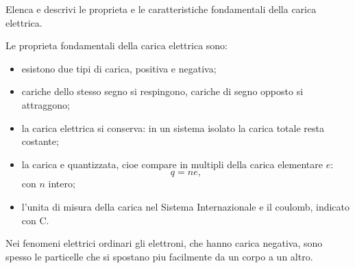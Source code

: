 
\begin{esercizio}
Elenca e descrivi le proprieta e le caratteristiche fondamentali della carica
elettrica.
\end{esercizio}

\begin{soluzione}
Le proprieta fondamentali della carica elettrica sono:
\begin{itemize}
  \item esistono due tipi di carica, positiva e negativa;
  \item cariche dello stesso segno si respingono, cariche di segno opposto si
  attraggono;
  \item la carica elettrica si conserva: in un sistema isolato la carica totale
  resta costante;
  \item la carica e quantizzata, cioe compare in multipli della carica
  elementare \(e\):
  \[
  q=ne,
  \]
  con \(n\) intero;
  \item l'unita di misura della carica nel Sistema Internazionale e il
  coulomb, indicato con \(\mathrm{C}\).
\end{itemize}

Nei fenomeni elettrici ordinari gli elettroni, che hanno carica negativa, sono
spesso le particelle che si spostano piu facilmente da un corpo a un altro.
\end{soluzione}
